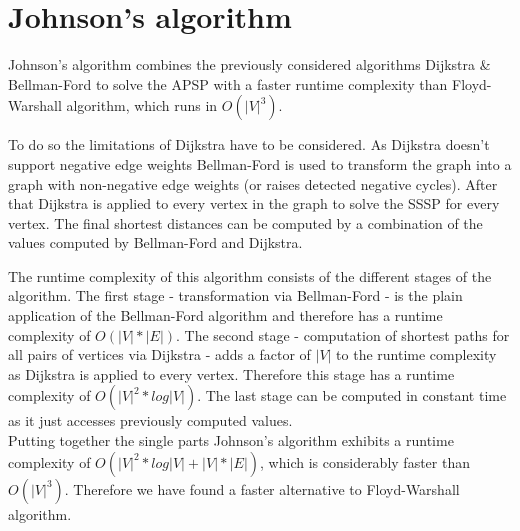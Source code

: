 \chapter{Johnson's algorithm}
Johnson's algorithm combines the previously considered algorithms Dijkstra \& Bellman-Ford to solve the \ac{APSP} with a faster runtime complexity than Floyd-Warshall algorithm, which runs in $O(|V|^3)$. \cite{Kiruthika.2012, Tamimi.2015}

To do so the limitations of Dijkstra have to be considered. As Dijkstra doesn't support negative edge weights Bellman-Ford is used to transform the graph into a graph with non-negative edge weights (or raises detected negative cycles). After that Dijkstra is applied to every vertex in the graph to solve the \ac{SSSP} for every vertex. The final shortest distances can be computed by a combination of the values computed by Bellman-Ford and Dijkstra. \cite{Kiruthika.2012}

The runtime complexity of this algorithm consists of the different stages of the algorithm. The first stage - transformation via Bellman-Ford - is the plain application of the Bellman-Ford algorithm and therefore has a runtime complexity of $O(|V|*|E|)$. The second stage - computation of shortest paths for all pairs of vertices via Dijkstra - adds a factor of $|V|$ to the runtime complexity as Dijkstra is applied to every vertex. Therefore this stage has a runtime complexity of $O(|V|^2*log|V|)$. The last stage can be computed in constant time as it just accesses previously computed values. \cite{Kiruthika.2012, Tamimi.2015} \\
Putting together the single parts Johnson's algorithm exhibits a runtime complexity of $O(|V|^2*log|V| + |V|*|E|)$, which is considerably faster than $O(|V|^3)$. Therefore we have found a faster alternative to Floyd-Warshall algorithm.